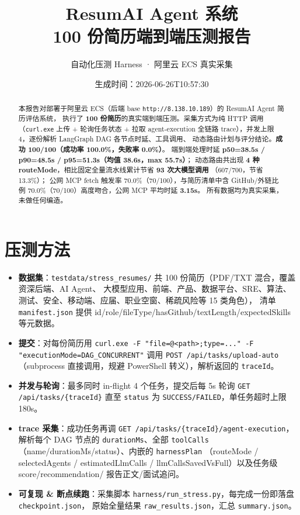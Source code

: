 \documentclass[11pt,a4paper]{ctexart}
\title{\textbf{ResumAI Agent 系统\\100 份简历端到端压测报告}}
\author{自动化压测 Harness · 阿里云 ECS 真实采集}
\date{生成时间：2026-06-26T10:57:30}
\begin{document}
\maketitle
\thispagestyle{fancy}

\begin{abstract}
本报告对部署于阿里云 ECS（后端 base \texttt{http://8.138.10.189}）的 ResumAI Agent 简历评估系统，
执行了 \textbf{100 份简历}的真实端到端压测。采集方式为纯 HTTP 调用（\texttt{curl.exe} 上传 + 轮询任务状态 +
拉取 agent-execution 全链路 trace），并发上限 4，逐份解析 LangGraph DAG 各节点时延、工具调用、
动态路由计划与评分结论。\textbf{成功 100/100（成功率 100.0\%，失败率 0.0\%）}。
端到端处理时延 \textbf{p50=38.5s / p90=48.5s / p95=51.3s（均值 38.6s，max 55.7s）}；
动态路由共出现 \textbf{4 种 routeMode}，相比固定全量流水线累计节省 \textbf{93 次大模型调用}
（607/700，节省 13.3\%）；
公网 MCP fetch 触发率 70.0\%（70/100），与简历清单中含 GitHub/外链比例 70.0\%（70/100）高度吻合，公网 MCP 平均时延 \textbf{3.15s}。
所有数据均为真实采集，未做任何编造。
\end{abstract}

\section{压测方法}
\begin{itemize}[leftmargin=1.4em]
  \item \textbf{数据集}：\texttt{testdata/stress\_resumes/} 共 100 份简历（PDF/TXT 混合，覆盖资深后端、AI Agent、
  大模型应用、前端、产品、数据平台、SRE、算法、测试、安全、移动端、应届、职业空窗、稀疏风险等 15 类角色），
  清单 \texttt{manifest.json} 提供 id/role/fileType/hasGithub/textLength/expectedSkills 等元数据。
  \item \textbf{提交}：对每份简历用 \texttt{curl.exe -F "file=@<path>;type=..." -F "executionMode=DAG\_CONCURRENT"}
  调用 \texttt{POST /api/tasks/upload-auto}（subprocess 直接调用，规避 PowerShell 转义），解析返回的 \texttt{traceId}。
  \item \textbf{并发与轮询}：最多同时 in-flight 4 个任务，提交后每 5s 轮询 \texttt{GET /api/tasks/\{traceId\}}
  直至 \texttt{status} 为 \texttt{SUCCESS/FAILED}，单任务超时上限 180s。
  \item \textbf{trace 采集}：成功任务再调 \texttt{GET /api/tasks/\{traceId\}/agent-execution}，解析每个 DAG 节点的
  \texttt{durationMs}、全部 \texttt{toolCalls}（name/durationMs/status）、内嵌的 \texttt{harnessPlan}
  （routeMode / selectedAgents / estimatedLlmCalls / llmCallsSavedVsFull）以及任务级 score/recommendation/
  报告正文/面试追问。
  \item \textbf{可复现 \& 断点续跑}：采集脚本 \texttt{harness/run\_stress.py}，每完成一份即落盘 \texttt{checkpoint.json}，
  原始全量结果 \texttt{raw\_results.json}，汇总 \texttt{summary.json}。
\end{itemize}
\end{document}
